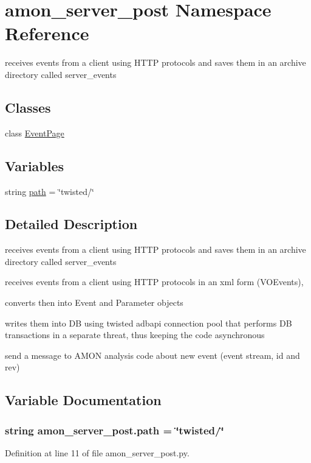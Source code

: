 \hypertarget{namespaceamon__server__post}{\section{amon\-\_\-server\-\_\-post Namespace Reference}
\label{namespaceamon__server__post}
}


receives events from a client using H\-T\-T\-P protocols and saves them in an archive directory called server\-\_\-events  


\subsection*{Classes}
\begin{DoxyCompactItemize}
\item 
class \hyperlink{classamon__server__post_1_1_event_page}{Event\-Page}
\end{DoxyCompactItemize}
\subsection*{Variables}
\begin{DoxyCompactItemize}
\item 
string \hyperlink{namespaceamon__server__post_aaeff5dac76a8f34d07656ac4d2aac125}{path} = \char`\"{}twisted/\char`\"{}
\end{DoxyCompactItemize}


\subsection{Detailed Description}
receives events from a client using H\-T\-T\-P protocols and saves them in an archive directory called server\-\_\-events 
\begin{DoxyItemize}
\item receives events from a client using H\-T\-T\-P protocols in an xml form (V\-O\-Events),
\item converts then into Event and Parameter objects
\item writes them into D\-B using twisted adbapi connection pool that performs D\-B transactions in a separate threat, thus keeping the code asynchronous
\item send a message to A\-M\-O\-N analysis code about new event (event stream, id and rev) 
\end{DoxyItemize}

\subsection{Variable Documentation}
\hypertarget{namespaceamon__server__post_aaeff5dac76a8f34d07656ac4d2aac125}{
\subsubsection[{path}]{\setlength{\rightskip}{0pt plus 5cm}string amon\-\_\-server\-\_\-post.\-path = \char`\"{}twisted/\char`\"{}}}\label{namespaceamon__server__post_aaeff5dac76a8f34d07656ac4d2aac125}


Definition at line 11 of file amon\-\_\-server\-\_\-post.\-py.

